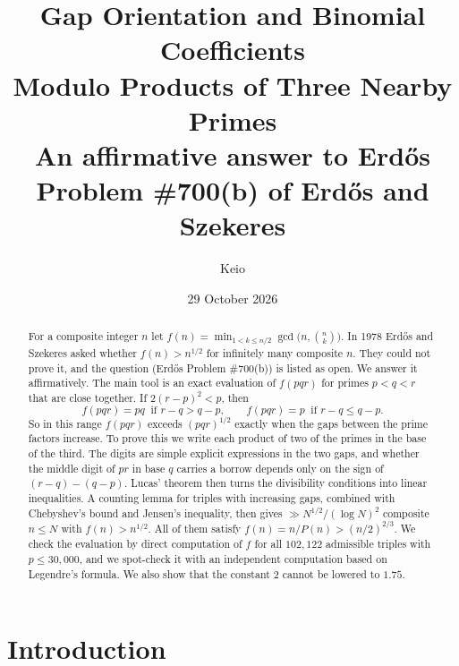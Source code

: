 \documentclass[11pt,a4paper]{article}
\title{\bfseries Gap Orientation and Binomial Coefficients\\ Modulo Products of Three Nearby Primes\\[6pt]
\large An affirmative answer to Erd\H{o}s Problem \#700(b) of Erd\H{o}s and Szekeres}
\author{Keio}
\date{29 October 2026}
\theoremstyle{definition}
\begin{document}
\maketitle

\begin{abstract}
For a composite integer $n$ let $f(n)=\min_{1<k\le n/2}\gcd\bigl(n,\binom nk\bigr)$. In 1978 Erd\H{o}s and Szekeres asked whether $f(n)>n^{1/2}$ for infinitely many composite $n$. They could not prove it, and the question (Erd\H{o}s Problem \#700(b)) is listed as open. We answer it affirmatively. The main tool is an exact evaluation of $f(pqr)$ for primes $p<q<r$ that are close together. If $2(r-p)^2<p$, then
\[
f(pqr)=pq \ \text{ if } r-q>q-p, \qquad f(pqr)=p \ \text{ if } r-q\le q-p .
\]
So in this range $f(pqr)$ exceeds $(pqr)^{1/2}$ exactly when the gaps between the prime factors increase. To prove this we write each product of two of the primes in the base of the third. The digits are simple explicit expressions in the two gaps, and whether the middle digit of $pr$ in base $q$ carries a borrow depends only on the sign of $(r-q)-(q-p)$. Lucas' theorem then turns the divisibility conditions into linear inequalities. A counting lemma for triples with increasing gaps, combined with Chebyshev's bound and Jensen's inequality, then gives $\gg N^{1/2}/(\log N)^2$ composite $n\le N$ with $f(n)>n^{1/2}$. All of them satisfy $f(n)=n/P(n)>(n/2)^{2/3}$. We check the evaluation by direct computation of $f$ for all $102{,}122$ admissible triples with $p\le 30{,}000$, and we spot-check it with an independent computation based on Legendre's formula. We also show that the constant $2$ cannot be lowered to $1.75$.
\end{abstract}

\section{Introduction}
\end{document}
